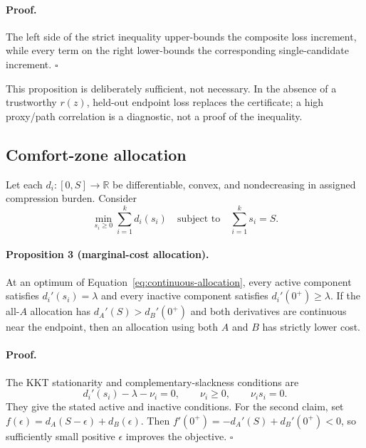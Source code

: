 \paragraph{Proof.}
The left side of the strict inequality upper-bounds the composite loss
increment, while every term on the right lower-bounds the corresponding
single-candidate increment. \hfill$\square$

This proposition is deliberately sufficient, not necessary.  In the
absence of a trustworthy $r(z)$, held-out endpoint loss replaces the
certificate; a high proxy/path correlation is a diagnostic, not a
proof of the inequality.

\subsection{Comfort-zone allocation}

Let each $d_i:[0,S]\rightarrow\mathbb{R}$ be differentiable, convex,
and nondecreasing in assigned compression burden.  Consider
\begin{equation}
\label{eq:continuous-allocation}
\min_{s_i\ge0}\sum_{i=1}^k d_i(s_i)
\quad\text{subject to}\quad \sum_{i=1}^k s_i=S.
\end{equation}

\paragraph{Proposition 3 (marginal-cost allocation).}
At an optimum of Equation~\eqref{eq:continuous-allocation}, every
active component satisfies $d_i'(s_i)=\lambda$ and every inactive
component satisfies $d_i'(0^+)\ge\lambda$.  If the all-$A$ allocation
has $d_A'(S)>d_B'(0^+)$ and both derivatives are continuous near the
endpoint, then an allocation using both $A$ and $B$ has strictly lower
cost.

\paragraph{Proof.}
The KKT stationarity and complementary-slackness conditions are
\begin{equation*}
d_i'(s_i)-\lambda-\nu_i=0,\qquad
\nu_i\ge0,\qquad \nu_i s_i=0.
\end{equation*}
They give the stated active and inactive conditions.  For the second
claim, set $f(\epsilon)=d_A(S-\epsilon)+d_B(\epsilon)$.  Then
$f'(0^+)=-d_A'(S)+d_B'(0^+)<0$, so sufficiently small positive
$\epsilon$ improves the objective. \hfill$\square$

